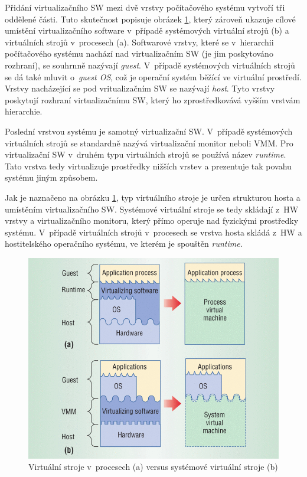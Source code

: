 Přidání virtualizačního SW mezi dvě vrstvy počítačového systému vytvoří tři oddělené části. Tuto skutečnost popisuje
obrázek \ref{figure:system_vs_proces}, který zároveň ukazuje cílové umístění virtualizačního software v~případě systémových
virtuální strojů (b) a virtuálních strojů v~procesech (a). Softwarové vrstvy, které se v~hierarchii počítačového systému nachází
nad virtualizačním SW (je jim poskytováno rozhraní), se souhrnně nazývají \textit{guest}. V~případě systémových virtuálních strojů
se dá také mluvit o~\textit{guest OS}, což je operační systém běžící ve virtuální prostředí. Vrstvy nacházející se pod vritualizačním
SW se nazývají \textit{host}. Tyto vrstvy poskytují rozhraní virtualizačnímu SW, který ho zprostředkovává vyšším vrstvám hierarchie.

Poslední vrstvou systému je samotný virtualizační SW. V~případě systémových virtuálních strojů se standardně nazývá virtualizační
monitor neboli VMM. Pro virtualizační SW v~druhém typu virtuálních strojů se používá název \textit{runtime}. Tato vrstva tedy
virtualizuje prostředky nižších vrstev a prezentuje tak povahu systému jiným způsobem. 

Jak je naznačeno na obrázku \ref{figure:system_vs_proces}, typ virtuálního stroje je určen strukturou hosta a umístěním virtualizačního
SW. Systémové virtuální stroje se tedy skládají z~HW vrstvy a virtualizačního monitoru, který přímo operuje nad fyzickými prostředky
systému. V~případě virtuálních strojů v~procesech se vrstva hosta skládá z~HW a hostitelského operačního systému, ve kterém je spouštěn
\textit{runtime}.
\begin{figure}
  \centering
  \includegraphics[scale=0.3]{assets/png/procesvm_vs_sysvm.png}
  \caption[Virtuální stroj v~procesu versus systémové virtuální stroje ]{Virtuální stroje v~procesech (a) versus systémové virtuální stroje (b) \cite{book:iee:vm_architecture}}
  \label{figure:system_vs_proces}
\end{figure}
